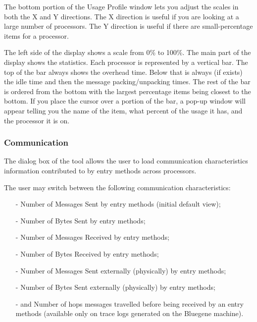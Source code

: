 \documentclass[10pt]{article}
\begin{document}
The bottom portion of the Usage Profile window lets you adjust the
scales in both the X and Y directions.  The X direction is useful if
you are looking at a large number of processors.  The Y direction is
useful if there are small-percentage items for a processor.

The left side of the display shows a scale from 0\% to 100\%.  The
main part of the display shows the statistics.  Each processor is
represented by a vertical bar.  The top of the bar always shows the
overhead time.  Below that is always (if exists) the idle time and
then the message packing/unpacking times.  The rest of the bar is
ordered from the bottom with the largest percentage items being
closest to the bottom.  If you place the cursor over a portion of the
bar, a pop-up window will appear telling you the name of the item,
what percent of the usage it has, and the processor it is on.

\subsubsection{Communication}

The dialog box of the tool allows the user to load communication
characteristics information contributed to by entry methods across
processors.

The user may switch between the following communication characteristics:

\begin{itemize}
\item[-] Number of Messages Sent by entry methods (initial default view);
\item[-] Number of Bytes Sent by entry methods;
\item[-] Number of Messages Received by entry methods;
\item[-] Number of Bytes Received by entry methods;
\item[-] Number of Messages Sent externally (physically) by entry methods;
\item[-] Number of Bytes Sent externally (physically) by entry methods;
\item[-] and Number of hops messages travelled before being received
by an entry methods (available only on trace logs generated on the
Bluegene machine).
\end{itemize}
\end{document}
